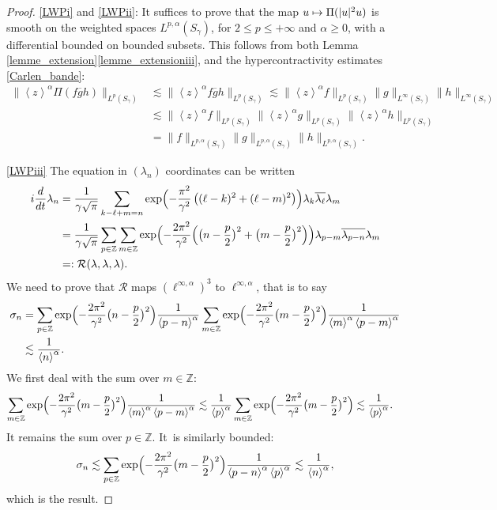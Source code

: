 \documentclass[JEP,XML,SOM,Unicode,NoFloatCountersInSection,published]{cedram}
\newcommand\mto{\mathchoice{\longmapsto}{\mapsto}{\mapsto}{\mapsto}}
\theoremstyle{definition}
\let\EE\exp
\let\ov\overline
\newcommand\Z{\mathbb Z}
\newcommand{\pa}[1]{\left(#1\right)}
\newcommand{\bra}[1]{\left\langle #1 \right\rangle}
\begin{document}
\skpt
\begin{proof}
\eqref{LWPi} and \eqref{LWPii}: It suffices to prove that the map $ u \mto \Pi(|u|^2u)$ is smooth on the weighted spaces $L^{p,\alpha}(S_\gamma)$, for $2 \leq p \leq +\infty$ and $\alpha \geq 0$, with a differential bounded on bounded subsets. This follows from both Lemma \ref{lemme_extension}\eqref{lemme_extensioniii}, and the hypercontractivity estimates \eqref{Carlen_bande}:
\begin{align*}
\|\bra{z}^\alpha\Pi(f\ov{g}h)\|_{L^{p}(S_{\gamma})} &\lesssim \|\bra{z}^\alpha f\ov{g}h\|_{L^{p}(S_{\gamma})} \lesssim \|\bra{z}^\alpha f\|_{L^{p}(S_{\gamma})} \|g\|_{L^{\infty}(S_{\gamma})}\|h\|_{L^{\infty}(S_{\gamma})} \\
& \lesssim \|\bra{z}^\alpha f\|_{L^{p}(S_{\gamma})}\|\bra{z}^\alpha g\|_{L^{p}(S_{\gamma})}\|\bra{z}^\alpha h\|_{L^{p}(S_{\gamma})} \\
& = \| f\|_{L^{p,\alpha}(S_{\gamma})} \| g\|_{L^{p,\alpha}(S_{\gamma})} \| h\|_{L^{p,\alpha}(S_{\gamma})}.
\end{align*}

\eqref{LWPiii} The equation in $(\lambda_n)$ coordinates can be written
\begin{align*}
i \frac{d}{dt} \lambda_n &= \frac{1}{\gamma\sqrt{\pi}}\sum_{k-\ell+m=n}\EE \Bigl({-\frac{\pi^2}{\gamma^2}\pa{(\ell-k)^2+(\ell-m)^2}}\Bigr) \lambda_{k} \ov{\lambda_{\ell}} \lambda_{m} \\
&= \frac{1}{\gamma\sqrt{\pi}}\sum_{p\in\Z}\sum_{m\in\Z}\EE \Bigl({-\frac{2\pi^2}{\gamma^2}\Bigl(\bigl(n-\frac{p}{2}\bigr)^2+\bigl(m-\frac{p}{2}\bigr)^2}\Bigr)\Bigr) \lambda_{p-m} \ov{\lambda_{p-n}}\lambda_{m}\\
& =: \mathcal{R}(\lambda,\lambda,\lambda).
\end{align*}
We need to prove that $\mathcal{R}$ maps $(\ell^{\infty,\alpha})^3$ to $\ell^{\infty,\alpha}$, that is to say
\begin{align*}
\sigma_n &= \sum_{p\in\Z} \EE\Bigl({-\frac{2\pi^2}{\gamma^2}\bigl({n-\frac{p}{2}}}\bigr)^2\Bigr) \frac{1}{\bra{p-n}^\alpha} \sum_{m\in\Z} \EE\Bigl({-\frac{2\pi^2}{\gamma^2}\bigl({m-\frac{p}{2}}}\bigr)^2\Bigr) \frac{1}{\bra{m}^\alpha\bra{p-m}^\alpha} \\
&\lesssim \frac{1}{\bra{n}^\alpha}.
\end{align*}
We first deal with the sum over $m \in \Z$:
\begin{align*}
\sum_{m\in\Z}\EE\Bigl({-\frac{2\pi^2}{\gamma^2}\bigl({m-\frac{p}{2}}}\bigr)^2\Bigr) \frac{1}{\bra{m}^\alpha\bra{p-m}^\alpha} &\lesssim \frac{1}{\bra{p}^\alpha} \sum_{m\in\Z}\EE\Bigl({-\frac{2\pi^2}{\gamma^2}\bigl({m-\frac{p}{2}}}\bigr)^2\Bigr)\lesssim \frac{1}{\bra{p}^\alpha}.
\end{align*}
It remains the sum over $p \in \Z$. It~is similarly bounded:
\[
\sigma_n \lesssim \sum_{p\in\Z} \EE\Bigl({-\frac{2\pi^2}{\gamma^2}\bigl({m-\frac{p}{2}}}\bigr)^2\Bigr) \frac{1}{\bra{p-n}^\alpha\bra{p}^\alpha} \lesssim \frac{1}{\bra{n}^\alpha}, 
\]
which is the result.
\end{proof}
\end{document}
